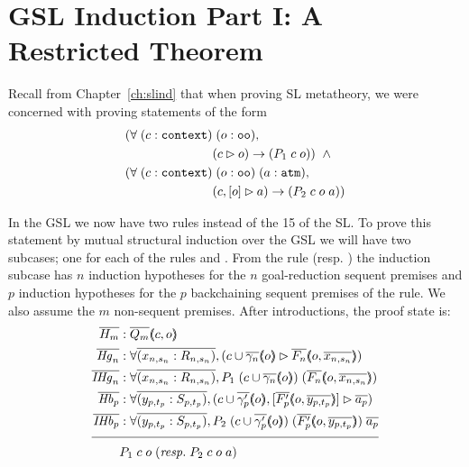 \section{GSL Induction Part I: A Restricted Theorem}
\label{sec:gsl}

Recall from Chapter~\ref{ch:slind} that when proving SL metatheory, we were concerned with proving statements of the form
\begin{align*}
(\forall \; (c : \sltm{context}) & \; (o : \sltm{oo}), \\
& (\seqsl[c]{o}) \rightarrow (P_1 \; c \; o)) \;\; \wedge \\
(\forall \; (c : \sltm{context}) & \; (o : \sltm{oo}) \; (a : \sltm{atm}), \\
& (\bchsl[c]{o}{a}) \rightarrow (P_2 \; c \; o \; a))
\end{align*}

In the GSL we now have two rules instead of the 15 of the SL. To prove this statement by mutual structural induction over the GSL we will have two subcases; one for each of the rules  and . From the rule  (resp. ) the induction subcase has $n$ induction hypotheses for the $n$ goal-reduction sequent premises and $p$ induction hypotheses for the $p$ backchaining sequent premises of the rule. We also assume the $m$ non-sequent premises. After introductions, the proof state is:
\begin{align*}
\ol{H_m} &: \ol{Q_m} \args{c , o} \\
\ol{\mathit{Hg}_n} &: \forall \ol{(x_{n,s_n} : R_{n,s_n})}, (\seqsl[c \cup \ol{\gamma_n} \args{o}]{\ol{F_n} \args{o , \ol{x_{n,s_n}}})} \\
\ol{\mathit{IHg}_n} &: \forall \ol{(x_{n,s_n} : R_{n,s_n})}, P_1 \; (c \cup \ol{\gamma_n} \args{o}) \; (\ol{F_n} \args{o , \ol{x_{n,s_n}}}) \\
\ol{\mathit{Hb}_p} &: \forall \ol{(y_{p,t_p} : S_{p,t_p})}, (\bchsl[c \cup \ol{\gamma'_p} \args{o}]{\ol{F'_p} \args{o , \ol{y_{p,t_p}}}}{\ol{a_p}}) \\
\ol{\mathit{IHb}_p} &: \forall \ol{(y_{p,t_p} : S_{p,t_p})}, P_2 \; (c \cup \ol{\gamma'_p} \args{o}) \; (\ol{F'_p} \args{o , \ol{y_{p,t_p}}}) \; \ol{a_p} \\[\pfshift{}]
\cline{1-2}
& P_1 \; c \; o \; (\mathit{resp.} \; P_2 \; c \; o \; a)
\end{align*}

